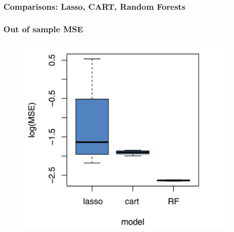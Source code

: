 \documentclass[
  shownotes,
  xcolor={svgnames},
  hyperref={colorlinks,citecolor=DarkBlue,linkcolor=DarkRed,urlcolor=DarkBlue}
  , aspectratio=169]{beamer}
\begin{document}
\begin{frame}[fragile]
\frametitle{Comparisons: Lasso, CART, Random Forests}
\frametitle{Out of sample MSE}


\begin{figure}[H] \centering
            \captionsetup{justification=centering}
              \includegraphics[scale=0.15]{figures/california_out_of_sample}
 \end{figure}

\end{frame}



\end{document}
